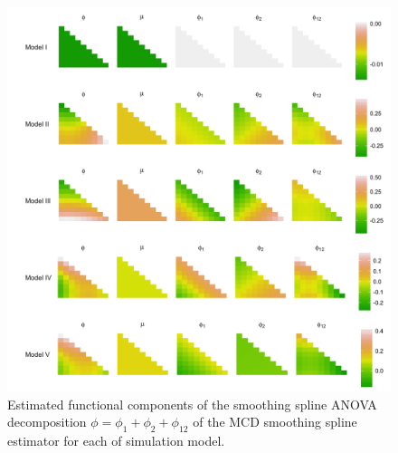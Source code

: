 \captionsetup[subfigure]{labelformat=empty}
\begin{figure}[H] \label{fig:ssanova-component-lattice}
\caption{Estimated functional components of the smoothing spline ANOVA decomposition $\phi = \phi_1 + \phi_2 + \phi_{12}$ of the MCD smoothing spline estimator for each of simulation model.}
  \includegraphics[width = \textwidth]{../img/chapter-4/ssanova-estimate-lattice}
\end{figure}
